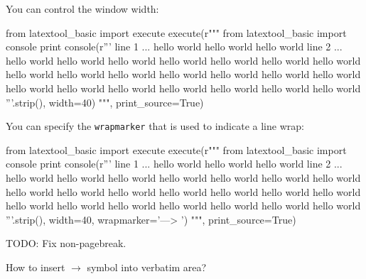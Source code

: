 You can control the window width:
\begin{python}
from latextool_basic import execute
execute(r"""
from latextool_basic import console
print console(r'''
line 1 ... hello world hello world hello world
line 2 ... hello world hello world hello world hello world hello world hello world hello world hello world hello world hello world hello world hello world hello world hello world hello world hello world hello world hello world hello world hello world hello world
'''.strip(), width=40)
""", print_source=True)
\end{python}

You can specify the \verb!wrapmarker! that is used to indicate a
line wrap:
\begin{python}
from latextool_basic import execute
execute(r"""
from latextool_basic import console
print console(r'''
line 1 ... hello world hello world hello world
line 2 ... hello world hello world hello world hello world hello world hello world hello world hello world hello world hello world hello world hello world hello world hello world hello world hello world hello world hello world hello world hello world hello world
'''.strip(), width=40, wrapmarker='---> ')
""", print_source=True)
\end{python}


TODO: Fix non-pagebreak.

How to insert $\rightarrow$ symbol into verbatim area?
